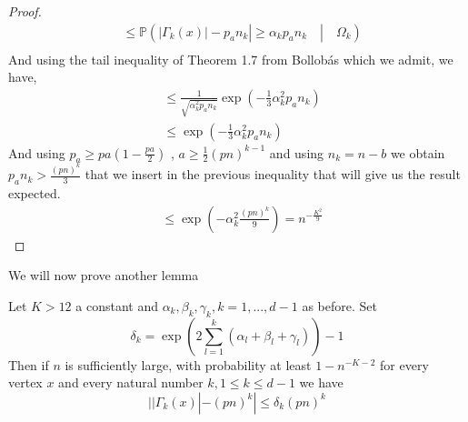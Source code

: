\begin{proof}
\begin{align}
		&\leq \mathbb{P}(|\Gamma_k(x)| - p_an_k| \geq \alpha_k p_an_k \quad|\quad \Omega_k)\\
	\end{align}
	And using the tail inequality of Theorem 1.7 from Bollob\'as \cite{Bollob01} which we admit, we have,
	\begin{align}
		&\leq \frac{1}{\sqrt{\alpha_k^2p_an_k}}\exp(-\frac{1}{3}\alpha_k^2p_an_k) \\
		&\leq \exp(-\frac{1}{3}\alpha_k^2p_an_k)
	\end{align}
	And using $p_a \geq pa(1-\frac{pa}{2})$ , $a \geq \frac{1}{2}(pn)^{k-1}$ and using $n_k = n-b$ we obtain $p_an_k > \frac{(pn)^k}{3}$ that we insert in the previous inequality that will give us the result expected.
	\begin{align}
		&\leq \exp(-\alpha_k^2\frac{(pn)^k}{9}) = n^{-\frac{K^2}{9}}
	\end{align}
\end{proof}
We will now prove another lemma
\begin{lemma}\label{th:KLemma}
	Let $K > 12$ a constant and $\alpha_k, \beta_k, \gamma_k, k=1,...,d-1$ as before.
	\newline
	Set 
	\begin{equation}
		\delta_k = \exp(2\sum_{l=1}^{k}(\alpha_l + \beta_l +\gamma_l)) - 1
	\end{equation}
	Then if $n$ is sufficiently large, with probability at least $1-n^{-K-2}$ for every vertex $x$ and every natural number $k, 1\leq k \leq d-1$ we have
	\begin{equation}
		||\Gamma_k(x)| - (pn)^k| \leq \delta_k(pn)^k
	\end{equation}
\end{lemma}

